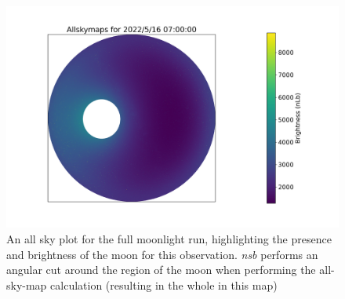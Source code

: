 \begin{figure}[ht]
\begin{centering}
\includegraphics[width=0.8\columnwidth]{./figures/allskyetacarextreme.png}
\caption{An all sky plot for the full moonlight run, highlighting the presence and brightness of the moon for this observation. \textit{nsb} performs an angular cut around the region of the moon when performing the all-sky-map calculation (resulting in the whole in this map)}
\label{fig:allskyetacarextreme}
\end{centering}
\end{figure}

